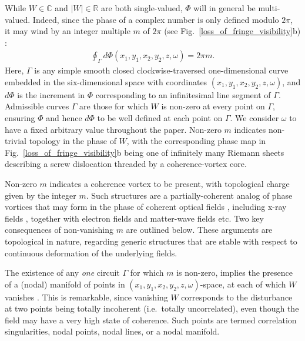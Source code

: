 \documentclass[%
 reprint,
 amsmath,amssymb,
 aps,
]{revtex4-1}
\begin{document}
While $W\in\mathbb{C}$ and $|W|\in\mathbb{R}$ are both single-valued, $\Phi$ will in general be multi-valued. Indeed, since the phase of a complex number is only defined modulo $2\pi$, it may wind by an integer multiple $m$ of $2\pi$ (see Fig.~\ref{loss_of_fringe_visibility}b) \cite{GburVisser2003,Marasinghe2011}: 
\begin{equation}
\begin{aligned}
\label{phase_of_W_winding}
\oint_{\Gamma} d\Phi(x_1,y_1,x_2,y_2,z,\omega)=2\pi m.
\end{aligned}
\end{equation}
Here, $\Gamma$ is any simple smooth closed clockwise-traversed one-dimensional curve embedded in the six-dimensional space with coordinates $(x_1,y_1,x_2,y_2,z,\omega)$, and $d\Phi$ is the increment in $\Phi$ corresponding to an infinitesimal line segment of $\Gamma$.  Admissible curves $\Gamma$ are those for which $W$ is non-zero at every point on $\Gamma$, ensuring $\Phi$ and hence $d\Phi$ to be well defined at each point on $\Gamma$.  We consider $\omega$ to have a fixed arbitrary value throughout the paper. Non-zero $m$ indicates non-trivial topology in the phase of $W$, with the corresponding phase map in Fig.~\ref{loss_of_fringe_visibility}b being one of infinitely many Riemann sheets describing a screw dislocation threaded by a coherence-vortex core. 

Non-zero $m$ indicates a coherence vortex \cite{GburVisser2003} to be present, with topological charge given by the integer $m$.  Such structures are a partially-coherent analog of phase vortices that may form in the phase of coherent optical fields \cite{NyeBerry1974,Nye1999,SoskinVasnetsov2001,DennisProgOpt2009}, including x-ray fields \cite{XRayVortex1,XRayVortex2,XRayVortex3,XRayVortex4,paganin_book,XRayVortex5,XRayVortex6,XRayVortex7}, together with electron fields \cite{MessiahBook,AllenOxleyPaganin2001, Petersen2013, Bliokh2017} and matter-wave fields \cite{PitaevskiiStringariBook} etc.  Two key consequences of non-vanishing $m$ are outlined below.  These arguments are topological in nature, regarding generic structures that are stable with respect to continuous deformation of the underlying fields. 

The existence of any {\em one} circuit $\Gamma$ for which $m$ is non-zero, implies the presence of a (nodal) manifold of points in $(x_1,y_1,x_2,y_2,z,\omega)$-space, at each of which $W$ vanishes \cite{Marasinghe2010,Marasinghe2011}.  This is remarkable, since vanishing $W$ corresponds to the disturbance at two points being totally incoherent (i.e.~totally uncorrelated), even though the field may have a very high state of coherence. Such points are termed correlation singularities, nodal points, nodal lines, or a nodal manifold.  
\end{document}
